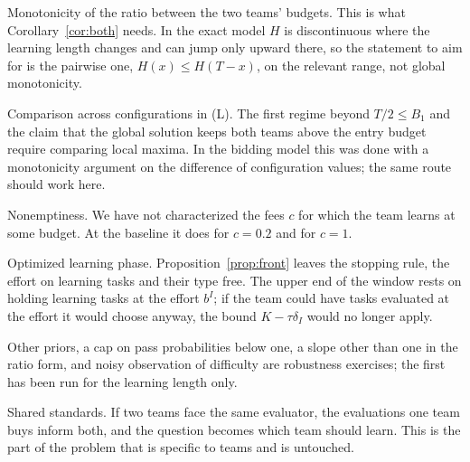 \documentclass[11pt]{article}
\theoremstyle{definition}
\begin{document}
Monotonicity of the ratio between the two teams' budgets. This is what Corollary~\ref{cor:both} needs. In the exact model $H$ is discontinuous where the learning length changes and can jump only upward there, so the statement to aim for is the pairwise one, $H(x)\le H(T-x)$, on the relevant range, not global monotonicity.

Comparison across configurations in (L). The first regime beyond $T/2\le B_1$ and the claim that the global solution keeps both teams above the entry budget require comparing local maxima. In the bidding model this was done with a monotonicity argument on the difference of configuration values; the same route should work here.

Nonemptiness. We have not characterized the fees $c$ for which the team learns at some budget. At the baseline it does for $c=0.2$ and for $c=1$.

Optimized learning phase. Proposition~\ref{prop:front} leaves the stopping rule, the effort on learning tasks and their type free. The upper end of the window rests on holding learning tasks at the effort $b^I$; if the team could have tasks evaluated at the effort it would choose anyway, the bound $K-\tau\delta_I$ would no longer apply.

Other priors, a cap on pass probabilities below one, a slope other than one in the ratio form, and noisy observation of difficulty are robustness exercises; the first has been run for the learning length only.

Shared standards. If two teams face the same evaluator, the evaluations one team buys inform both, and the question becomes which team should learn. This is the part of the problem that is specific to teams and is untouched.
\end{document}
